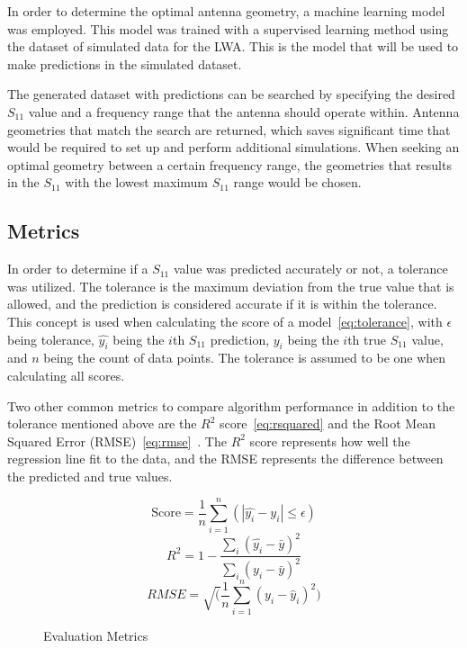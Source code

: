 \documentclass[conference]{IEEEtran}
\begin{document}
In order to determine the optimal antenna geometry, a machine learning model was employed. This model was trained with a supervised learning method using the dataset of simulated data for the LWA. This is the model that will be used to make predictions in the simulated dataset.

The generated dataset with predictions can be searched by specifying the desired $S_{11}$ value and a frequency range that the antenna should operate within. Antenna geometries that match the search are returned, which saves significant time that would be required to set up and perform additional simulations. When seeking an optimal geometry between a certain frequency range, the geometries that results in the $S_{11}$ with the lowest maximum $S_{11}$ range would be chosen.


\subsection{Metrics}
In order to determine if a $S_{11}$ value was predicted accurately or not, a tolerance was utilized. The tolerance is the maximum deviation from the true value that is allowed, and the prediction is considered accurate if it is within the tolerance. This concept is used when calculating the score of a model~\eqref{eq:tolerance}, with $\epsilon$ being tolerance, $\hat{y_i}$ being the $i$th $S_{11}$ prediction, $y_i$ being the $i$th true $S_{11}$ value, and $n$ being the count of data points. The tolerance is assumed to be one when calculating all scores.

Two other common metrics to compare algorithm performance in addition to the tolerance mentioned above are the $R^2$ score~\eqref{eq:rsquared} and the Root Mean Squared Error (RMSE)~\eqref{eq:rmse}~\cite{shcherbakov_survey_2013}. The $R^2$ score represents how well the regression line fit to the data, and the RMSE represents the difference between the predicted and true values.

\begin{figure}[h]
    \begin{equation}
        \text{Score} = \frac{1}{n} \sum_{i=1}^{n}(\left|\hat{y_i} - y_i\right| \leq \epsilon)
        \label{eq:tolerance}
    \end{equation}
    \begin{equation}
        R^2 = 1 - \frac{\sum_{i}(\hat{y_i} - \bar{y})^2}{\sum_{i}(y_i - \bar{y})^2}
        \label{eq:rsquared}
    \end{equation}
    \begin{equation}
        {RMSE} = \sqrt(\frac{1}{n} \sum_{i=1}^{n}(y_i - \hat{y}_i)^2)
        \label{eq:rmse}
    \end{equation}
    \caption{Evaluation Metrics}
\end{figure}
\end{document}
